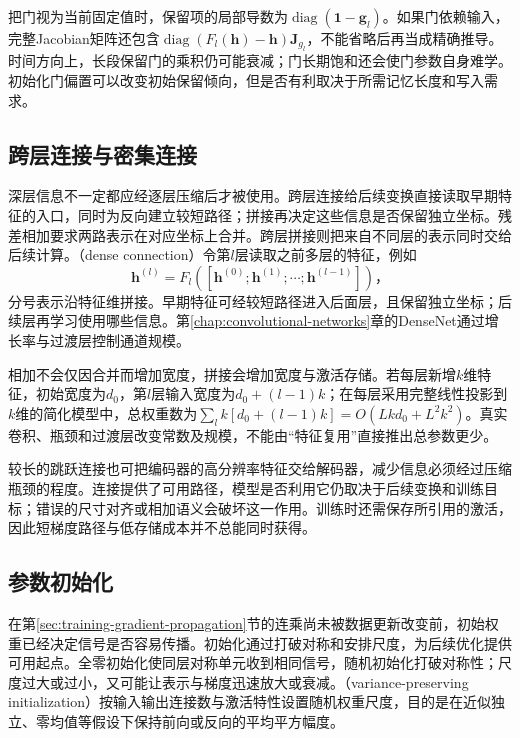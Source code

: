 把门视为当前固定值时，保留项的局部导数为$\operatorname{diag}(\bm1-\bm g_l)$。如果门依赖输入，完整Jacobian矩阵还包含$\operatorname{diag}(F_l(\bm h)-\bm h)\bm J_{g_l}$，不能省略后再当成精确推导。时间方向上，长段保留门的乘积仍可能衰减；门长期饱和还会使门参数自身难学。初始化门偏置可以改变初始保留倾向，但是否有利取决于所需记忆长度和写入需求。

\subsection{跨层连接与密集连接}
\label{sec:training-dense-connections}

深层信息不一定都应经逐层压缩后才被使用。跨层连接给后续变换直接读取早期特征的入口，同时为反向建立较短路径；拼接再决定这些信息是否保留独立坐标。残差相加要求两路表示在对应坐标上合并。跨层拼接则把来自不同层的表示同时交给后续计算。（dense connection）令第$l$层读取之前多层的特征，例如
\begin{equation}
  \bm h^{(l)}=F_l([\bm h^{(0)};\bm h^{(1)};\cdots;\bm h^{(l-1)}])\text{，}
  \label{eq:training-dense-concat}
\end{equation}
分号表示沿特征维拼接。早期特征可经较短路径进入后面层，且保留独立坐标；后续层再学习使用哪些信息。第\ref{chap:convolutional-networks}章的DenseNet通过增长率与过渡层控制通道规模。

相加不会仅因合并而增加宽度，拼接会增加宽度与激活存储。若每层新增$k$维特征，初始宽度为$d_0$，第$l$层输入宽度为$d_0+(l-1)k$；在每层采用完整线性投影到$k$维的简化模型中，总权重数为$\sum_l k[d_0+(l-1)k]=O(Lkd_0+L^2k^2)$。真实卷积、瓶颈和过渡层改变常数及规模，不能由“特征复用”直接推出总参数更少。

较长的跳跃连接也可把编码器的高分辨率特征交给解码器，减少信息必须经过压缩瓶颈的程度。连接提供了可用路径，模型是否利用它仍取决于后续变换和训练目标；错误的尺寸对齐或相加语义会破坏这一作用。训练时还需保存所引用的激活，因此短梯度路径与低存储成本并不总能同时获得。

\subsection{参数初始化}
\label{sec:training-initialization-constraints}
\label{sec:training-initialization}

在第\ref{sec:training-gradient-propagation}节的连乘尚未被数据更新改变前，初始权重已经决定信号是否容易传播。初始化通过打破对称和安排尺度，为后续优化提供可用起点。全零初始化使同层对称单元收到相同信号，随机初始化打破对称性；尺度过大或过小，又可能让表示与梯度迅速放大或衰减。（variance-preserving initialization）按输入输出连接数与激活特性设置随机权重尺度，目的是在近似独立、零均值等假设下保持前向或反向的平均平方幅度。

